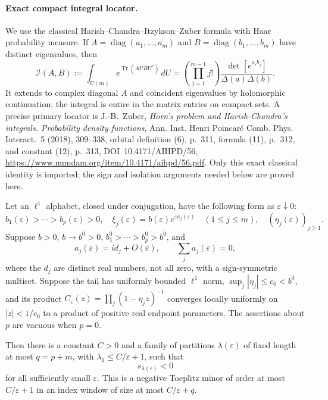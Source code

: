 \paragraph{Exact compact integral locator.}
We use the classical Harish--Chandra--Itzykson--Zuber formula with Haar
probability measure. If $A=\operatorname{diag}(a_1,\ldots,a_m)$ and
$B=\operatorname{diag}(b_1,\ldots,b_m)$ have distinct eigenvalues, then
\begin{equation}\label{eq:analytic-HCIZ}
 \mathcal I(A,B):=\int_{U(m)}e^{\operatorname{Tr}(AUBU^*)}\,dU
       =\left(\prod_{j=1}^{m-1}j!\right)
                    \frac{\det[e^{a_i b_j}]}{\Delta(a)\Delta(b)}.
\end{equation}
It extends to complex diagonal $A$ and coincident eigenvalues by
holomorphic continuation; the integral is entire in the matrix entries
on compact sets. A precise primary locator is J.-B.~Zuber,
\emph{Horn's problem and Harish-Chandra's integrals. Probability
density functions}, Ann. Inst. Henri Poincar\'e Comb. Phys. Interact.~5
(2018), 309--338, orbital definition (6), p.~311, formula (11), p.~312,
and constant (12), p.~313, DOI~10.4171/AIHPD/56,
\url{https://www.numdam.org/item/10.4171/aihpd/56.pdf}.
Only this exact classical identity is imported; the sign and isolation
arguments needed below are proved here.

\begin{lemma}
\label{lem:analytic-cluster-Schur-witness}
Let an $\ell^1$ alphabet, closed under conjugation, have the following
form as $\varepsilon\downarrow0$:
\[
 b_1(\varepsilon)>\cdots>b_p(\varepsilon)>0,\quad
 \xi_j(\varepsilon)=b(\varepsilon)
                  e^{\varepsilon a_j(\varepsilon)}\quad(1\le j\le m),
                       \quad (\eta_j(\varepsilon))_{j\ge1}.
\]
Suppose $b>0$, $b\to b^0>0$,
$b_1^0>\cdots>b_p^0>b^0$, and
\[
 a_j(\varepsilon)=i d_j+O(\varepsilon),\qquad
 \sum_j a_j(\varepsilon)=0,
\]
where the $d_j$ are distinct real numbers, not all zero, with a
sign-symmetric multiset. Suppose the tail has uniformly bounded
$\ell^1$ norm, $\sup_j|\eta_j|\le c_0<b^0$, and its product
$C_\varepsilon(z)=\prod_j(1-\eta_jz)^{-1}$ converges locally uniformly
on $|z|<1/c_0$ to a product of positive real endpoint parameters.
The assertions about $p$ are vacuous when $p=0$.

Then there is a constant $C>0$ and a family of partitions
$\lambda(\varepsilon)$ of fixed length at most $q=p+m$, with
$\lambda_1\le C/\varepsilon+1$, such that
\[
                        s_{\lambda(\varepsilon)}<0
\]
for all sufficiently small $\varepsilon$. This is a negative
Toeplitz minor of order at most $C/\varepsilon+1$ in an index
window of size at most $C/\varepsilon+q$.
\end{lemma}

